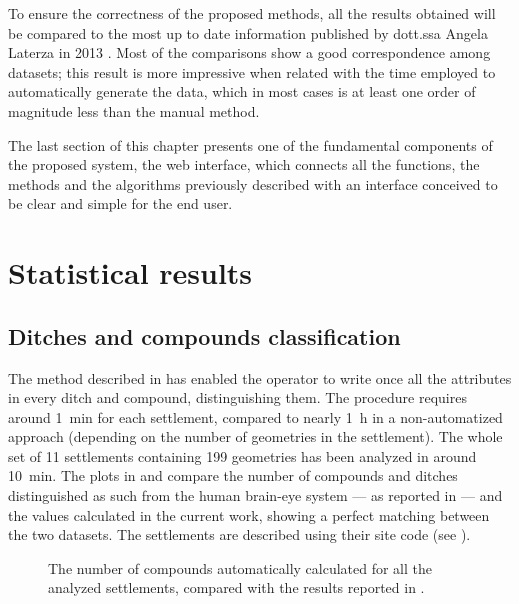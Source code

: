     To ensure the correctness of the proposed methods, all the results obtained will be compared to the most up to date information published by dott.ssa Angela Laterza in 2013 \cite{laterza}. Most of the comparisons show a good correspondence among datasets; this result is more impressive when related with the time employed to automatically generate the data, which in most cases is at least one order of magnitude less than the manual method.
    
    The last section of this chapter presents one of the fundamental components of the proposed system, the web interface, which connects all the functions, the methods and the algorithms previously described with an interface conceived to be clear and simple for the end user.

    \section{Statistical results}
        \subsection{Ditches and compounds classification}
            The method described in  has enabled the operator to write once all the attributes in every ditch and compound, distinguishing them. The procedure requires around \SI{1}{\minute} for each settlement, compared to nearly \SI{1}{\hour} in a non-automatized approach (depending on the number of geometries in the settlement). The whole set of 11 settlements containing 199 geometries has been analyzed in around \SI{10}{\minute}. The plots in  and  compare the number of compounds and ditches distinguished as such from the human brain-eye system --- as reported in \cite{laterza} --- and the values calculated in the current work, showing a perfect matching between the two datasets. The settlements are described using their site code (see ).

            \begin{figure}[H]
                \centering
                \begin{tikzpicture}
                    
                \end{tikzpicture}
                \caption[The number of compounds in \cite{laterza} compared to the results of the proposed method.]{The number of compounds automatically calculated for all the analyzed settlements, compared with the results reported in \cite{laterza}.}
                \label{fig:graph-num-compound}
            \end{figure}

